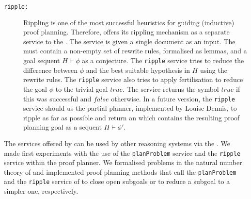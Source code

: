 \begin{description}
\item[{\tt ripple:}] Rippling is one of the most successful heuristics
  for guiding (inductive) proof planning. Therefore, {\lclam} offers
  its rippling mechanism as a separate service to the {\mathwebsb}.
  The service is given a single {\omdoc} document as an input. The
  {\omdoc} must contain a non-empty set of rewrite rules, formalised
  as lemmas, and a goal sequent $H\vdash \phi$ as a conjecture. The
  {\tt ripple} service tries to reduce the difference between $\phi$
  and the best suitable hypothesis in $H$ using the rewrite rules.
  The {\tt ripple} service also tries to apply fertilisation to reduce
  the goal $\phi$ to the trivial goal $true$.  The service returns the
  {\openmath} symbol $true$ if this was successful and $false$
  otherwise.  In a future version, the {\tt ripple} service should us
  the partial planner, implemented by Louise Dennis, to ripple as far
  as possible and return an {\omdoc} which contains the resulting
  proof planning goal as a sequent $H\vdash \phi'$.
    

\end{description}
The services offered by {\lclam} can be used by other reasoning
systems via the {\mathwebsb}. We made first experiments with the use
of the {\tt planProblem} service and the {\tt ripple} service within
the {\OMEGA} proof planner.  We formalised problems in the natural
number theory of {\OMEGA} and implemented proof planning methods that
call the {\tt planProblem} and the {\tt ripple} service of {\lclam} to
close open subgoals or to reduce a subgoal to a simpler one,
respectively.

